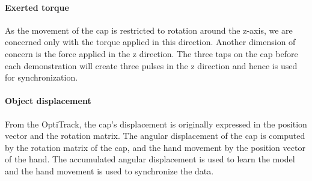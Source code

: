 \paragraph{\textbf{Exerted torque}}
\label{ftsensor}
As the movement of the cap is restricted to rotation around the
z-axis, we are concerned only with the torque applied in this direction.
Another dimension of concern is the force applied in the z direction. The
three taps on the cap before each demonstration will create three
pulses in the z direction and hence is used for synchronization. 


\paragraph{\textbf{Object displacement}}
\label{sec:optiktrack}
From the OptiTrack, the cap's displacement is originally expressed in
the position vector and the rotation matrix. The angular
displacement of the cap is computed by the rotation matrix of the cap, and 
the hand movement by the position vector of the hand. The accumulated
angular displacement is used to learn the model and the hand movement
is used to synchronize the data. %
%




